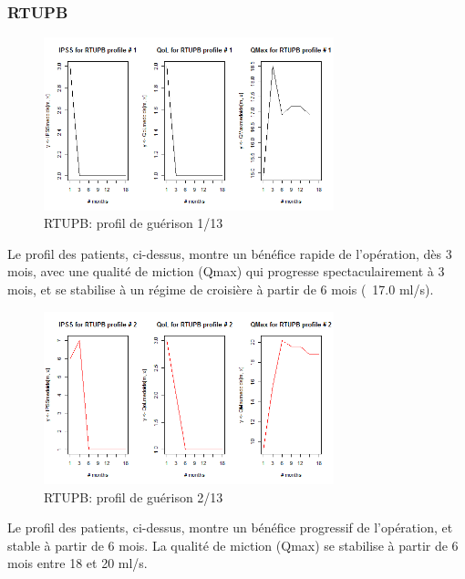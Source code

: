 %
%

%

\subsubsection{RTUPB}

\begin{figure}[H]
\centering
\includegraphics[width=0.75\textwidth]{../Fig/RTUPB/rtupb-profil-post-01.png}
\caption[]{RTUPB: profil de guérison 1/13}
\label{fig-rtupb-post-profil1}
\end{figure}

Le profil des patients, ci-dessus, montre un bénéfice rapide de l'opération, dès 3 mois, avec une qualité de miction (Qmax) qui progresse spectaculairement à 3 mois, et se stabilise à un régime de croisière à partir de 6 mois (~17.0 ml/s).

\begin{figure}[H]
\centering
\includegraphics[width=0.75\textwidth]{../Fig/RTUPB/rtupb-profil-post-02.png}
\caption[]{RTUPB: profil de guérison 2/13}
\label{fig-rtupb-post-profil2}
\end{figure}

Le profil des patients, ci-dessus, montre un bénéfice progressif de l'opération, et stable à partir de 6 mois. La qualité de miction (Qmax) se stabilise à partir de 6 mois entre 18 et 20 ml/s.


